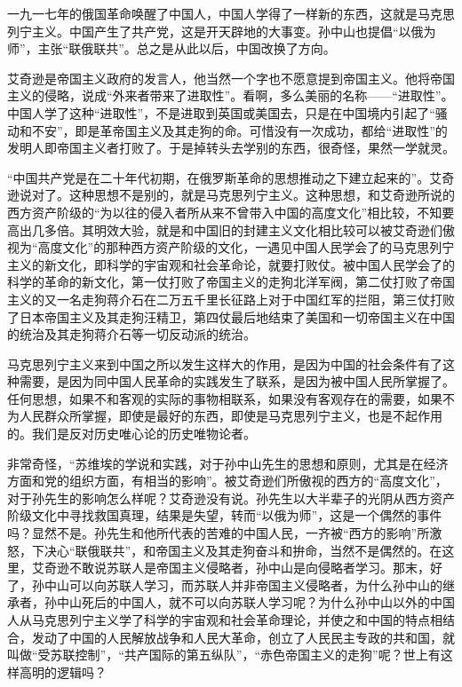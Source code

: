 \documentclass[UTF-8, a5paper, 12pt]{ctexart}
\begin{document}
一九一七年的俄国革命唤醒了中国人，中国人学得了一样新的东西，这就是马克思列宁主义。中国产生了共产党，这是开天辟地的大事变。孙中山也提倡“以俄为师”，主张“联俄联共”。总之是从此以后，中国改换了方向。

艾奇逊是帝国主义政府的发言人，他当然一个字也不愿意提到帝国主义。他将帝国主义的侵略，说成“外来者带来了进取性”。看啊，多么美丽的名称——“进取性”。中国人学了这种“进取性”，不是进取到英国或美国去，只是在中国境内引起了“骚动和不安”，即是革帝国主义及其走狗的命。可惜没有一次成功，都给“进取性”的发明人即帝国主义者打败了。于是掉转头去学别的东西，很奇怪，果然一学就灵。

“中国共产党是在二十年代初期，在俄罗斯革命的思想推动之下建立起来的”。艾奇逊说对了。这种思想不是别的，就是马克思列宁主义。这种思想，和艾奇逊所说的西方资产阶级的“为以往的侵入者所从来不曾带入中国的高度文化”相比较，不知要高出几多倍。其明效大验，就是和中国旧的封建主义文化相比较可以被艾奇逊们傲视为“高度文化”的那种西方资产阶级的文化，一遇见中国人民学会了的马克思列宁主义的新文化，即科学的宇宙观和社会革命论，就要打败仗。被中国人民学会了的科学的革命的新文化，第一仗打败了帝国主义的走狗北洋军阀，第二仗打败了帝国主义的又一名走狗蒋介石在二万五千里长征路上对于中国红军的拦阻，第三仗打败了日本帝国主义及其走狗汪精卫，第四仗最后地结束了美国和一切帝国主义在中国的统治及其走狗蒋介石等一切反动派的统治。

马克思列宁主义来到中国之所以发生这样大的作用，是因为中国的社会条件有了这种需要，是因为同中国人民革命的实践发生了联系，是因为被中国人民所掌握了。任何思想，如果不和客观的实际的事物相联系，如果没有客观存在的需要，如果不为人民群众所掌握，即使是最好的东西，即使是马克思列宁主义，也是不起作用的。我们是反对历史唯心论的历史唯物论者。

非常奇怪，“苏维埃的学说和实践，对于孙中山先生的思想和原则，尤其是在经济方面和党的组织方面，有相当的影响”。被艾奇逊们所傲视的西方的“高度文化”，对于孙先生的影响怎么样呢？艾奇逊没有说。孙先生以大半辈子的光阴从西方资产阶级文化中寻找救国真理，结果是失望，转而“以俄为师”，这是一个偶然的事件吗？显然不是。孙先生和他所代表的苦难的中国人民，一齐被“西方的影响”所激怒，下决心“联俄联共”，和帝国主义及其走狗奋斗和拚命，当然不是偶然的。在这里，艾奇逊不敢说苏联人是帝国主义侵略者，孙中山是向侵略者学习。那末，好了，孙中山可以向苏联人学习，而苏联人并非帝国主义侵略者，为什么孙中山的继承者，孙中山死后的中国人，就不可以向苏联人学习呢？为什么孙中山以外的中国人从马克思列宁主义学了科学的宇宙观和社会革命理论，并使之和中国的特点相结合，发动了中国的人民解放战争和人民大革命，创立了人民民主专政的共和国，就叫做“受苏联控制”，“共产国际的第五纵队”，“赤色帝国主义的走狗”呢？世上有这样高明的逻辑吗？
\end{document}
